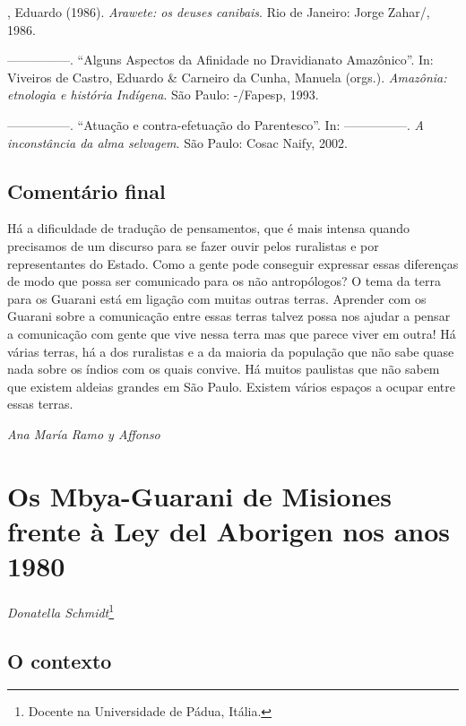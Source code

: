 \begin{Parskip}
  , Eduardo (1986). \emph{Arawete: os deuses canibais}. Rio de
Janeiro: Jorge Zahar/, 1986.

—————. ``Alguns Aspectos da Afinidade no Dravidianato Amazônico''. In:
Viveiros de Castro, Eduardo \& Carneiro da Cunha, Manuela (orgs.).
\emph{Amazônia: etnologia e história Indígena}. São Paulo: -/Fapesp,
1993.

—————. ``Atuação e contra-efetuação do Parentesco''. In: —————. \emph{A inconstância da
alma selvagem}. São Paulo: Cosac Naify, 2002.
\end{Parskip}

\section{Comentário final}
Há a dificuldade de tradução de pensamentos, que é mais intensa quando
precisamos de um discurso para se fazer ouvir pelos ruralistas e por
representantes do Estado. Como a gente pode conseguir expressar essas
diferenças de modo que possa ser comunicado para os não antropólogos? O
tema da terra para os Guarani está em ligação com muitas outras terras.
Aprender com os Guarani sobre a comunicação entre essas terras talvez
possa nos ajudar a pensar a comunicação com gente que vive nessa terra
mas que parece viver em outra! Há várias terras, há a dos ruralistas e
a da maioria da população que não sabe quase nada sobre os índios com
os quais convive. Há muitos paulistas que não sabem que existem aldeias
grandes em São Paulo. Existem vários espaços a ocupar entre essas
terras. 
\medskip
\begin{flushright}
\emph{Ana María Ramo y Affonso}
\end{flushright}

\chapter{Os Mbya-Guarani de Misiones frente à Ley del Aborigen nos anos 1980}
\begin{flushright}
\emph{Donatella Schmidt}\footnote{Docente na Universidade de Pádua, Itália.}
\end{flushright}
\medskip

\section{O contexto}


